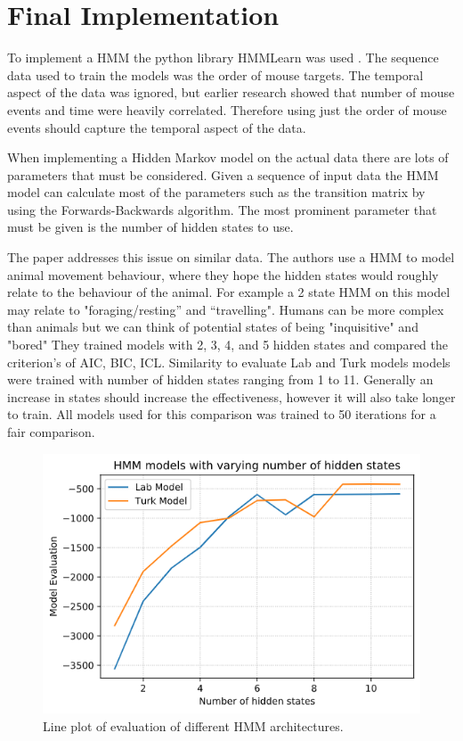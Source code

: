 \documentclass{article}
\begin{document}
\section{Final Implementation}


To implement a HMM the python library HMMLearn was used \cite{hmmlearn}.
The sequence data used to train the models was the order of mouse targets.
The temporal aspect of the data was ignored, but earlier research showed that number of mouse events and time were heavily correlated.
Therefore using just the order of mouse events should capture the temporal aspect of the data.

When implementing a Hidden Markov model on the actual data there are lots of parameters that must be considered. 
Given a sequence of input data the HMM model can calculate most of the parameters such as the transition matrix by using the Forwards-Backwards algorithm.
The most prominent parameter that must be given is the number of hidden states to use.

The paper \cite{pohle2017selecting} addresses this issue on similar data.
The authors use a HMM to model animal movement behaviour, where they hope the hidden states would roughly relate to the behaviour of the animal.
For example a 2 state HMM on this model may relate to "foraging/resting” and “travelling".
Humans can be more complex than animals but we can think of potential states of being "inquisitive" and "bored"
They trained models with 2, 3, 4, and 5 hidden states and compared the criterion's of AIC, BIC, ICL.
Similarity to evaluate Lab and Turk models models were trained with number of hidden states ranging from 1 to 11.
Generally an increase in states should increase the effectiveness, however it will also take longer to train.
All models used for this comparison was trained to 50 iterations for a fair comparison. 

\begin{figure}[ht]
    \centering
    \includegraphics[scale=0.55]{Images/ModelEvaluation.png}
    \caption{Line plot of evaluation of different HMM architectures.}
    \label{fig:ModleEval}
\end{figure}
\end{document}
